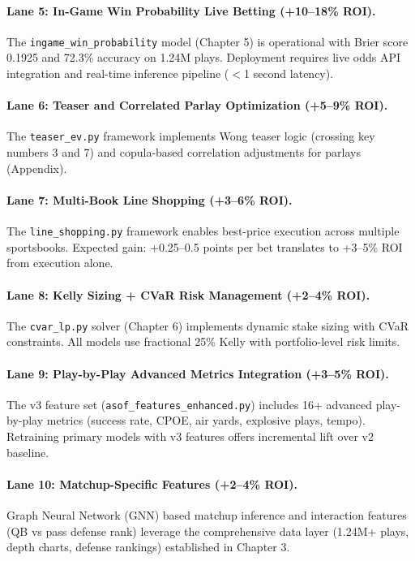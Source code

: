 \paragraph{Lane 5: In-Game Win Probability Live Betting (+10--18\% ROI).}
The \texttt{ingame\_win\_probability} model (Chapter 5) is operational with Brier score 0.1925 and 72.3\% accuracy on 1.24M plays. Deployment requires live odds API integration and real-time inference pipeline ($<$1 second latency).

\paragraph{Lane 6: Teaser and Correlated Parlay Optimization (+5--9\% ROI).}
The \texttt{teaser\_ev.py} framework implements Wong teaser logic (crossing key numbers 3 and 7) and copula-based correlation adjustments for parlays (Appendix).

\paragraph{Lane 7: Multi-Book Line Shopping (+3--6\% ROI).}
The \texttt{line\_shopping.py} framework enables best-price execution across multiple sportsbooks. Expected gain: +0.25--0.5 points per bet translates to +3--5\% ROI from execution alone.

\paragraph{Lane 8: Kelly Sizing + CVaR Risk Management (+2--4\% ROI).}
The \texttt{cvar\_lp.py} solver (Chapter 6) implements dynamic stake sizing with CVaR constraints. All models use fractional 25\% Kelly with portfolio-level risk limits.

\paragraph{Lane 9: Play-by-Play Advanced Metrics Integration (+3--5\% ROI).}
The v3 feature set (\texttt{asof\_features\_enhanced.py}) includes 16+ advanced play-by-play metrics (success rate, CPOE, air yards, explosive plays, tempo). Retraining primary models with v3 features offers incremental lift over v2 baseline.

\paragraph{Lane 10: Matchup-Specific Features (+2--4\% ROI).}
Graph Neural Network (GNN) based matchup inference and interaction features (QB vs pass defense rank) leverage the comprehensive data layer (1.24M+ plays, depth charts, defense rankings) established in Chapter 3.

